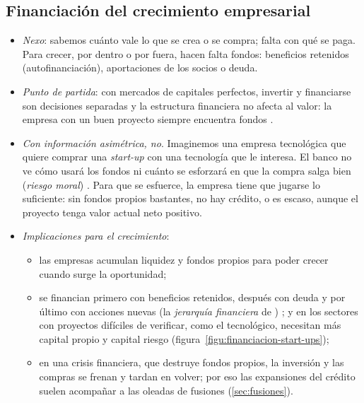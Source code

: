 \documentclass[11pt]{article}
\begin{document}
\subsection{Financiación del crecimiento empresarial}\label{sec:financiacion-crecimiento}

\begin{itemize}
\item \emph{Nexo}: sabemos cuánto vale lo que se crea o se compra; falta con qué se paga. Para crecer, por dentro o por fuera, hacen falta fondos: beneficios retenidos (autofinanciación), aportaciones de los socios o deuda.
\item \emph{Punto de partida}: con mercados de capitales perfectos, invertir y financiarse son decisiones separadas y la estructura financiera no afecta al valor: la empresa con un buen proyecto siempre encuentra fondos\nocite{ModiglianiMiller1958Cost} .
\item \emph{Con información asimétrica, no}. Imaginemos una empresa tecnológica que quiere comprar una \emph{start-up} con una tecnología que le interesa. El banco no ve cómo usará los fondos ni cuánto se esforzará en que la compra salga bien (\emph{riesgo moral}) . Para que se esfuerce, la empresa tiene que jugarse lo suficiente: sin fondos propios bastantes, no hay crédito, o es escaso, aunque el proyecto tenga valor actual neto positivo\nocite{HolmstromTirole2011Inside}.
\item \emph{Implicaciones para el crecimiento}:
  \begin{itemize}
  \item las empresas acumulan liquidez y fondos propios para poder crecer cuando surge la oportunidad;
  \item se financian primero con beneficios retenidos, después con deuda y por último con acciones nuevas (la \emph{jerarquía financiera} de \textcite{MyersMajluf1984Corporate}) ; y en los sectores con proyectos difíciles de verificar, como el tecnológico, necesitan más capital propio y capital riesgo (figura~\ref{figu:financiacion-start-ups});
  \item en una crisis financiera, que destruye fondos propios, la inversión y las compras se frenan y tardan en volver; por eso las expansiones del crédito suelen acompañar a las oleadas de fusiones (\ref{sec:fusiones}).
  \end{itemize}
\end{itemize}
\end{document}
